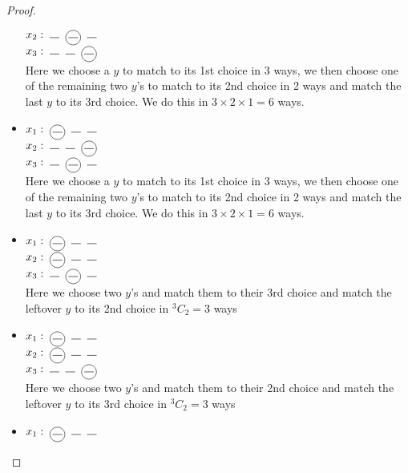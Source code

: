 \documentclass[a4paper,10pt]{article}
\theoremstyle{plain} %
\theoremstyle{plain} %
\newcommand*\circled[1]{\tikz[baseline=(char.base)]{
            \node[shape=circle,draw,inner sep=2pt] (char) {#1};}}
\begin{document}
\begin{proof}
\begin{itemize}
        $x_2: \; \rule{0.3cm}{0.15mm} \; \; \circled{\rule{0.3cm}{0.15mm}} \; \; \rule{0.3cm}{0.15mm}$ \\
        $x_3: \; \rule{0.3cm}{0.15mm} \; \; \rule{0.3cm}{0.15mm} \; \; \circled{\rule{0.3cm}{0.15mm}}$ \\
        Here we choose a $y$ to match to its 1st choice in 3 ways, we then choose one of the remaining two $y$'s to match to its 2nd choice in 2 ways and match the last $y$ to its 3rd choice. We do this in $3 \times 2 \times 1 = 6$ ways.
        \item 
        $x_1: \; \circled{\rule{0.3cm}{0.15mm}} \; \; \rule{0.3cm}{0.15mm} \; \; \rule{0.3cm}{0.15mm}$ \\
        $x_2: \; \rule{0.3cm}{0.15mm} \; \; \rule{0.3cm}{0.15mm} \; \; \circled{\rule{0.3cm}{0.15mm}}$ \\
        $x_3: \; \rule{0.3cm}{0.15mm} \; \; \circled{\rule{0.3cm}{0.15mm}} \; \; \rule{0.3cm}{0.15mm}$ \\
        Here we choose a $y$ to match to its 1st choice in 3 ways, we then choose one of the remaining two $y$'s to match to its 2nd choice in 2 ways and match the last $y$ to its 3rd choice. We do this in $3 \times 2 \times 1 = 6$ ways.
        \item 
        $x_1: \; \circled{\rule{0.3cm}{0.15mm}} \; \; \rule{0.3cm}{0.15mm} \; \; \rule{0.3cm}{0.15mm}$ \\
        $x_2: \; \circled{\rule{0.3cm}{0.15mm}} \; \; \rule{0.3cm}{0.15mm} \; \; \rule{0.3cm}{0.15mm}$ \\
        $x_3: \; \rule{0.3cm}{0.15mm} \; \; \circled{\rule{0.3cm}{0.15mm}} \; \; \rule{0.3cm}{0.15mm}$ \\
        Here we choose two $y$'s and match them to their 3rd choice and match the leftover $y$ to its 2nd choice in $^3C_2 = 3$ ways
        \item 
        $x_1: \; \circled{\rule{0.3cm}{0.15mm}} \; \; \rule{0.3cm}{0.15mm} \; \; \rule{0.3cm}{0.15mm}$ \\
        $x_2: \; \circled{\rule{0.3cm}{0.15mm}} \; \; \rule{0.3cm}{0.15mm} \; \; \rule{0.3cm}{0.15mm}$ \\
        $x_3: \; \rule{0.3cm}{0.15mm} \; \; \rule{0.3cm}{0.15mm} \; \; \circled{\rule{0.3cm}{0.15mm}}$ \\
        Here we choose two $y$'s and match them to their 2nd choice and match the leftover $y$ to its 3rd choice in $^3C_2 = 3$ ways
        \item 
        $x_1: \; \circled{\rule{0.3cm}{0.15mm}} \; \; \rule{0.3cm}{0.15mm} \; \; \rule{0.3cm}{0.15mm}$ \\

\end{itemize}
\end{proof}
\end{document}

